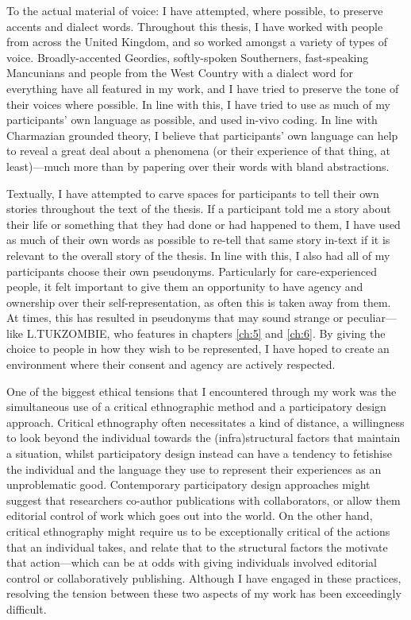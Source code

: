 To the actual material of voice: I have attempted, where possible, to preserve accents and dialect words. Throughout this thesis, I have worked with people from across the United Kingdom, and so worked amongst a variety of types of voice. Broadly-accented Geordies, softly-spoken Southerners, fast-speaking Mancunians and people from the West Country with a dialect word for everything have all featured in my work, and I have tried to preserve the tone of their voices where possible. In line with this, I have tried to use as much of my participants' own language as possible, and used in-vivo coding. In line with Charmazian grounded theory, I believe that participants' own language can help to reveal a great deal about a phenomena (or their experience of that thing, at least)—much more than by papering over their words with bland abstractions.   

Textually, I have attempted to carve spaces for participants to tell their own stories throughout the text of the thesis. If a participant told me a story about their life or something that they had done or had happened to them, I have used as much of their own words as possible to re-tell that same story in-text if it is relevant to the overall story of the thesis. In line with this, I also had all of my participants choose their own pseudonyms. Particularly for care-experienced people, it felt important to give them an opportunity to have agency and ownership over their self-representation, as often this is taken away from them. At times, this has resulted in pseudonyms that may sound strange or peculiar—like L.TUKZOMBIE, who features in chapters \ref{ch:5} and \ref{ch:6}. By giving the choice to people in how they wish to be represented, I have hoped to create an environment where their consent and agency are actively respected.

One of the biggest ethical tensions that I encountered through my work was the simultaneous use of a critical ethnographic method and a participatory design approach. Critical ethnography often necessitates a kind of distance, a willingness to look beyond the individual towards the (infra)structural factors that maintain a situation, whilst participatory design instead can have a tendency to fetishise the individual and the language they use to represent their experiences as an unproblematic good. Contemporary participatory design approaches might suggest that researchers co-author publications with collaborators, or allow them editorial control of work which goes out into the world. On the other hand, critical ethnography might require us to be exceptionally critical of the actions that an individual takes, and relate that to the structural factors the motivate that action—which can be at odds with giving individuals involved editorial control or collaboratively publishing. Although I have engaged in these practices, resolving the tension between these two aspects of my work has been exceedingly difficult.

